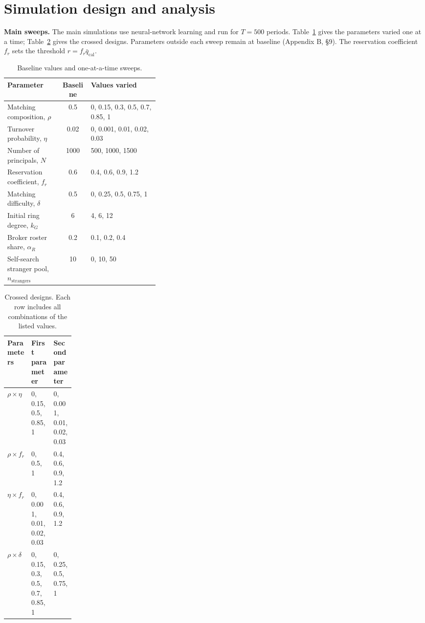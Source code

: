 \section*{Simulation design and analysis}

\textbf{Main sweeps.} The main simulations use neural-network learning and run for \(T=500\) periods. Table~\ref{tab:supp-oat} gives the parameters varied one at a time; Table~\ref{tab:supp-grids} gives the crossed designs. Parameters outside each sweep remain at baseline (Appendix B, \S9). The reservation coefficient \(f_r\) sets the threshold \(r=f_r\bar q_{\mathrm{cal}}\).

\begin{table}[htbp]
\centering
\caption{Baseline values and one-at-a-time sweeps.}
\label{tab:supp-oat}
\small
\begin{tabularx}{\linewidth}{@{}>{\raggedright\arraybackslash}p{0.36\linewidth}cX@{}}
\toprule
Parameter & Baseline & Values varied \\
\midrule
Matching composition, \(\rho\) & 0.5 & 0, 0.15, 0.3, 0.5, 0.7, 0.85, 1 \\
Turnover probability, \(\eta\) & 0.02 & 0, 0.001, 0.01, 0.02, 0.03 \\
Number of principals, \(N\) & 1000 & 500, 1000, 1500 \\
Reservation coefficient, \(f_r\) & 0.6 & 0.4, 0.6, 0.9, 1.2 \\
Matching difficulty, \(\delta\) & 0.5 & 0, 0.25, 0.5, 0.75, 1 \\
Initial ring degree, \(k_G\) & 6 & 4, 6, 12 \\
Broker roster share, \(\alpha_R\) & 0.2 & 0.1, 0.2, 0.4 \\
Self-search stranger pool, \(n_{\mathrm{strangers}}\) & 10 & 0, 10, 50 \\
\bottomrule
\end{tabularx}
\end{table}

\begin{table}[htbp]
\centering
\caption{Crossed designs. Each row includes all combinations of the listed values.}
\label{tab:supp-grids}
\small
\begin{tabularx}{\linewidth}{@{}>{\raggedright\arraybackslash}p{0.16\linewidth}XX@{}}
\toprule
Parameters & First parameter & Second parameter \\
\midrule
\(\rho\times \eta\) & 0, 0.15, 0.5, 0.85, 1 & 0, 0.001, 0.01, 0.02, 0.03 \\
\(\rho\times f_r\) & 0, 0.5, 1 & 0.4, 0.6, 0.9, 1.2 \\
\(\eta\times f_r\) & 0, 0.001, 0.01, 0.02, 0.03 & 0.4, 0.6, 0.9, 1.2 \\
\(\rho\times \delta\) & 0, 0.15, 0.3, 0.5, 0.7, 0.85, 1 & 0, 0.25, 0.5, 0.75, 1 \\
\bottomrule
\end{tabularx}
\end{table}

